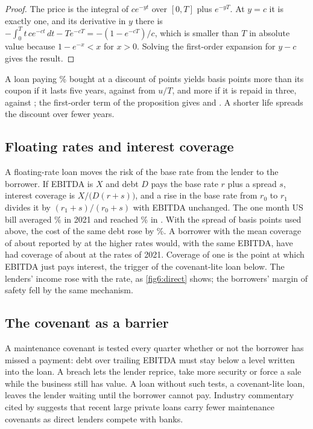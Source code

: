 \begin{chapterrefs}
\begin{proof}
The price is the integral of $ce^{-yt}$ over $[0,T]$ plus $e^{-yT}$. At $y=c$ it is exactly one, and
its derivative in $y$ there is $-\int_0^Tt\,ce^{-ct}\,dt-Te^{-cT}=-(1-e^{-cT})/c$, which is
smaller than $T$ in absolute value because $1-e^{-x}<x$ for $x>0$. Solving the first-order expansion
for $y-c$ gives the result.
\end{proof}

 A loan paying \oiC\% bought at a discount of \oiU{} points yields \oiBpFive{} basis points more
than its coupon if it lasts five years, against \oiApproxFive{} from $u/T$, and \oiBpThree{} more if it is
repaid in three, against \oiApproxThree; the first-order term of the proposition gives \oiFirstFive{}
and \oiFirstThree. A shorter life spreads the discount over fewer years.

\subsection{Floating rates and interest coverage}

A floating-rate loan moves the risk of the base rate from the lender to the borrower. If EBITDA is $X$
and debt $D$ pays the base rate $r$ plus a spread $s$, interest coverage is $X/\bigl(D(r+s)\bigr)$, and
a rise in the base rate from $r_0$ to $r_1$ divides it by $(r_1+s)/(r_0+s)$ with EBITDA unchanged.
 The one month US bill averaged \icBillLow\% in 2021 and reached \icBillHigh\% in
\dlBillHighQ. With the spread of \utSu{} basis points used above, the cost of the same debt rose by
\icCostRise\%. A borrower with the mean coverage of about \dlIcrPrivate{} reported by \textcite{cai2024}
at the higher rates would, with the same EBITDA, have had coverage of about \icLow{} at the rates of
2021. Coverage of one is the point at which EBITDA just pays interest, the trigger of the covenant-lite
loan below. The lenders' income rose with the rate, as \cref{fig6:direct} shows; the borrowers' margin
of safety fell by the same mechanism.

\subsection{The covenant as a barrier}

A maintenance covenant is tested every quarter whether or not the borrower has missed a payment: debt
over trailing EBITDA must stay below a level written into the loan. A breach lets the lender reprice,
take more security or force a sale while the business still has value. A loan without such tests, a
covenant-lite loan, leaves the lender waiting until the borrower cannot pay. Industry commentary cited by
\textcite{cai2024} suggests that recent large private loans carry fewer maintenance covenants as direct
lenders compete with banks.


\end{chapterrefs}
